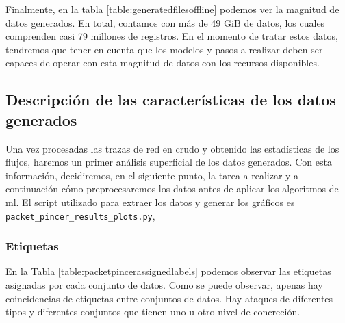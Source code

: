 Finalmente, en la tabla \ref{table:generatedfilesoffline} podemos ver la magnitud de datos generados. En total, contamos con más de 49 GiB de datos, los cuales comprenden casi 79 millones de registros. En el momento de tratar estos datos, tendremos que tener en cuenta que los modelos y pasos a realizar deben ser capaces de operar con esta magnitud de datos con los recursos disponibles.

\subsection{Descripción de las características de los datos generados}

Una vez procesadas las trazas de red en crudo y obtenido las estadísticas de los flujos, haremos un primer análisis superficial de los datos generados. Con esta información, decidiremos, en el siguiente punto, la tarea a realizar y a continuación cómo preprocesaremos los datos antes de aplicar los algoritmos de \gls{ml}. El script utilizado para extraer los datos y generar los gráficos es \texttt{packet\_pincer\_results\_plots.py},

\subsubsection{Etiquetas}

En la Tabla \ref{table:packetpincerassignedlabels} podemos observar las etiquetas asignadas por cada conjunto de datos. Como se puede observar, apenas hay coincidencias de etiquetas entre conjuntos de datos. Hay ataques de diferentes tipos y diferentes conjuntos que tienen uno u otro nivel de concreción.

